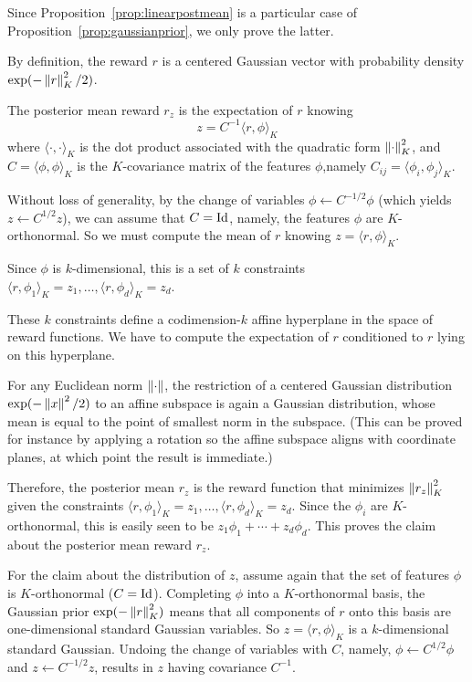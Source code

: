\documentclass[11pt,a4paper]{article}
\begin{document}
\begin{dem}
Since Proposition~\ref{prop:linearpostmean} is a particular case of
Proposition~\ref{prop:gaussianprior}, we only prove the latter.

By definition, the reward $r$ is a centered
Gaussian vector with probability density $\exp(-\left\lVert r\right\rVert^2_K/2)$.

The posterior mean reward $r_z$ is the expectation of $r$ knowing
\begin{equation}
z=C^{-1}\langle r,\phi\rangle_K
\end{equation}
where
$\langle
\cdot,\cdot\rangle_K$ is the dot product associated with the quadratic
form $\left\lVert\cdot\right\rVert^2_K$, and
$C=\langle \phi,\phi\rangle_K$
is the $K$-covariance matrix of the features $\phi$,namely
$C_{ij}=\langle \phi_i,\phi_j\rangle_K$.

Without loss of generality, by the change of
variables $\phi\gets C^{-1/2}\phi$ (which yields $z\gets C^{1/2}z$), we
can assume that $C=\operatorname{Id}$, namely, the features $\phi$ are $K$-orthonormal. So we must compute
the mean of $r$ knowing $z=\langle r,\phi\rangle_K$.

Since $\phi$ is $k$-dimensional, this is a set of $k$ constraints
$\langle r,\phi_1\rangle_K=z_1, \ldots, \langle
r,\phi_d\rangle_K=z_d$.

These $k$ constraints define a codimension-$k$ affine hyperplane in the space of
reward functions. We have to compute the expectation of $r$ conditioned
to $r$ lying on this hyperplane.

For any Euclidean norm $\left\lVert\cdot\right\rVert$, 
the restriction of a centered Gaussian distribution $\exp(-\left\lVert x\right\rVert^2/2)$
to an affine subspace is again a Gaussian distribution, whose mean is
equal to the point of smallest norm in the subspace. (This can be proved
for instance by applying a rotation so the affine subspace aligns with
coordinate planes, at which point the result is immediate.)

Therefore, the posterior mean $r_z$ is the reward function that minimizes
$\left\lVert r_z\right\rVert^2_K$ given the constraints $\langle
r,\phi_1\rangle_K=z_1, \ldots, \langle r,\phi_d\rangle_K=z_d$.
Since the $\phi_i$ are $K$-orthonormal, this is easily seen to be
$z_1\phi_1+\cdots+z_d \phi_d$. This proves the claim about the posterior
mean reward $r_z$.

For the claim about the distribution of $z$, assume again that the set of features
$\phi$ is $K$-orthonormal ($C=\operatorname{Id}$). Completing $\phi$ into a $K$-orthonormal
basis, the Gaussian prior $\exp(-\left\lVert r\right\rVert^2_K)$ means that all components
of $r$ onto this basis are one-dimensional standard Gaussian variables.
So $z=\langle r,\phi\rangle_K$ is a $k$-dimensional standard Gaussian.
Undoing the change of variables with $C$, namely, $\phi \gets C^{1/2}\phi$ and
$z\gets C^{-1/2}z$, results in $z$ having covariance
$C^{-1}$.
\end{dem}
\end{document}
